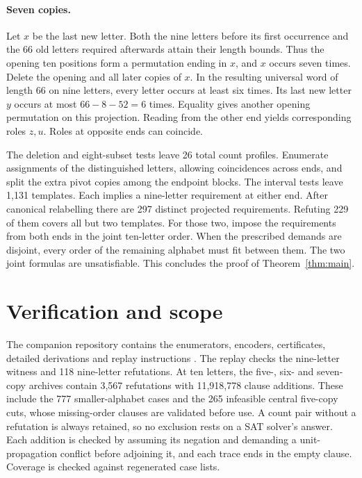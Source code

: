 \documentclass[11pt]{article}
\begin{document}
\paragraph{Seven copies.}
Let $x$ be the last new letter. Both the nine letters before its first occurrence and the 66 old letters required afterwards attain their length bounds. Thus the opening ten positions form a permutation ending in $x$, and $x$ occurs seven times. Delete the opening and all later copies of $x$. In the resulting universal word of length 66 on nine letters, every letter occurs at least six times. Its last new letter $y$ occurs at most $66-8-52=6$ times. Equality gives another opening permutation on this projection. Reading from the other end yields corresponding roles $z,u$. Roles at opposite ends can coincide.

The deletion and eight-subset tests leave 26 total count profiles. Enumerate assignments of the distinguished letters, allowing coincidences across ends, and split the extra pivot copies among the endpoint blocks. The interval tests leave 1,131 templates. Each implies a nine-letter requirement at either end. After canonical relabelling there are 297 distinct projected requirements. Refuting 229 of them covers all but two templates. For those two, impose the requirements from both ends in the joint ten-letter order. When the prescribed demands are disjoint, every order of the remaining alphabet must fit between them. The two joint formulas are unsatisfiable. This concludes the proof of Theorem~\ref{thm:main}.

\section{Verification and scope}
The companion repository contains the enumerators, encoders, certificates, detailed derivations and replay instructions \cite{companion}. The replay checks the nine-letter witness and 118 nine-letter refutations. At ten letters, the five-, six- and seven-copy archives contain 3,567 refutations with 11,918,778 clause additions. These include the 777 smaller-alphabet cases and the 265 infeasible central five-copy cuts, whose missing-order clauses are validated before use. A count pair without a refutation is always retained, so no exclusion rests on a SAT solver's answer. Each addition is checked by assuming its negation and demanding a unit-propagation conflict before adjoining it, and each trace ends in the empty clause. Coverage is checked against regenerated case lists.
\end{document}
